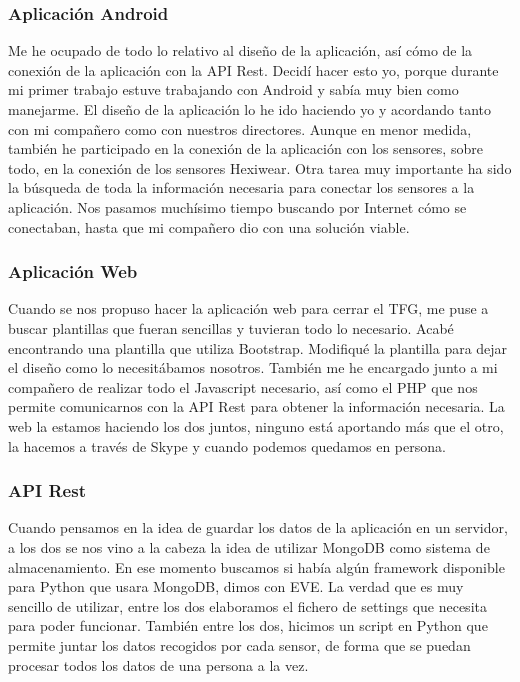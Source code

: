 \documentclass[11pt,spanish]{article}
\begin{document}
\subsubsection{Aplicación Android} 
Me he ocupado de todo lo relativo al diseño de la aplicación, así cómo de la conexión de la aplicación con la API Rest. Decidí hacer esto yo, porque durante mi primer trabajo estuve trabajando con Android y sabía muy bien como manejarme. El diseño de la aplicación lo he ido haciendo yo y acordando tanto con mi compañero como con nuestros directores. Aunque en menor medida, también he participado en la conexión de la aplicación con los sensores, sobre todo, en la conexión de los sensores Hexiwear. Otra tarea muy importante ha sido la búsqueda de toda la información necesaria para conectar los sensores a la aplicación. Nos pasamos muchísimo tiempo buscando por Internet cómo se conectaban, hasta que mi compañero dio con una solución viable.
    
\subsubsection{Aplicación Web} 
Cuando se nos propuso hacer la aplicación web para cerrar el TFG, me puse a buscar plantillas que fueran sencillas y tuvieran todo lo necesario. Acabé encontrando una plantilla que utiliza Bootstrap. Modifiqué la plantilla para dejar el diseño como lo necesitábamos nosotros. También me he encargado junto a mi compañero de realizar todo el Javascript necesario, así como el PHP que nos permite comunicarnos con la API Rest para obtener la información necesaria. La web la estamos haciendo los dos juntos, ninguno está aportando más que el otro, la hacemos a través de Skype y cuando podemos quedamos en persona.

\subsubsection{API Rest} 
Cuando pensamos en la idea de guardar los datos de la aplicación en un servidor, a los dos se nos vino a la cabeza la idea de utilizar MongoDB como sistema de almacenamiento. En ese momento buscamos si había algún framework disponible para Python que usara MongoDB, dimos con EVE. La verdad que es muy sencillo de utilizar, entre los dos elaboramos el fichero de settings que necesita para poder funcionar. También entre los dos, hicimos un script en Python que permite juntar los datos recogidos por cada sensor, de forma que se puedan procesar todos los datos de una persona a la vez.
\end{document}
